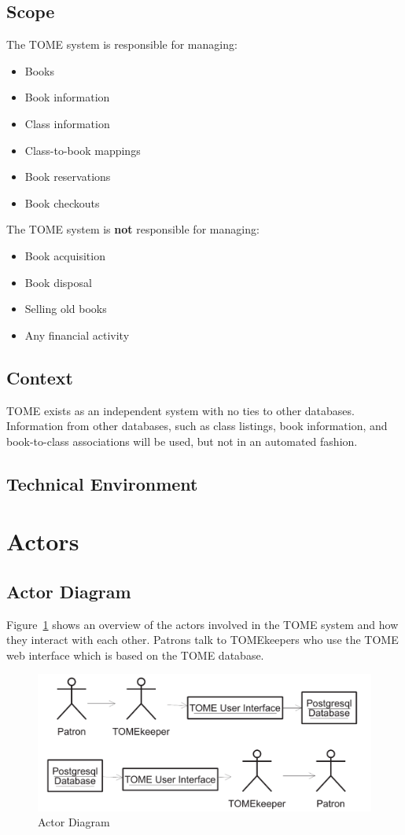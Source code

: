 \documentclass[12pt,titlepage]{article}
\begin{document}
\subsection{Scope}
The TOME system is responsible for managing:
\begin{itemize}
	\item Books
	\item Book information
	\item Class information
	\item Class-to-book mappings
	\item Book reservations
	\item Book checkouts
\end{itemize}
The TOME system is \textbf{not} responsible for managing:
\begin{itemize}
	\item Book acquisition
	\item Book disposal
	\item Selling old books
	\item Any financial activity
\end{itemize}
\subsection{Context}
TOME exists as an independent system with no ties to other databases.  Information from other databases, such as class listings, book information, and book-to-class associations will be used, but not in an automated fashion.
\subsection{Technical Environment}
\section{Actors}
\subsection{Actor Diagram}
Figure~\ref{userdiagram} shows an overview of the actors involved in the TOME system and how they interact with each other.  Patrons talk to TOMEkeepers who use the TOME web interface which is based on the TOME database.
\begin{figure}[h]
	\includegraphics[width=\textwidth]{userdiagram}
	\caption{Actor Diagram}
	\label{userdiagram}
\end{figure}
\end{document}
